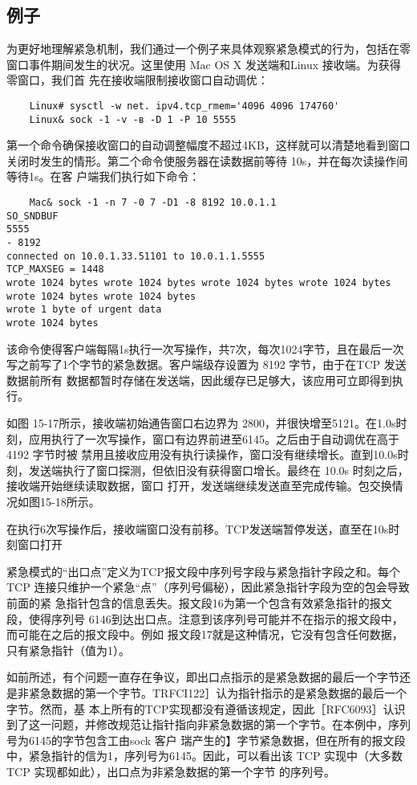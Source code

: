 \subsection{例子}
为更好地理解紧急机制，我们通过一个例子来具体观察紧急模式的行为，包括在零窗口事件期间发生的状况。这里使用 Mac OS X 发送端和Linux 接收端。为获得零窗口，我们首
先在接收端限制接收窗口自动调优：

\begin{verbatim}
    Linux# sysctl -w net. ipv4.tcp_rmem='4096 4096 174760'
    Linux& sock -1 -v -в -D 1 -P 10 5555
\end{verbatim}

第一个命令确保接收窗口的自动调整幅度不超过4KB，这样就可以清楚地看到窗口关闭时发生的情形。第二个命令使服务器在读数据前等待 10s，并在每次读操作间等待1s。在客
户端我们执行如下命令：
\begin{verbatim}
    Mac& sock -1 -n 7 -0 7 -D1 -8 8192 10.0.1.1
SO_SNDBUF
5555
- 8192
connected on 10.0.1.33.51101 to 10.0.1.1.5555
TCP_MAXSEG = 1448
wrote 1024 bytes wrote 1024 bytes wrote 1024 bytes wrote 1024 bytes wrote 1024 bytes wrote 1024 bytes
wrote 1 byte of urgent data
wrote 1024 bytes
\end{verbatim}

该命令使得客户端每隔1s执行一次写操作，共7次，每次1024字节，且在最后一次写之前写了1个字节的紧急数据。客户端级存设置为 8192 字节，由于在TCP 发送数据前所有
数据都暂时存储在发送端，因此缓存已足够大，该应用可立即得到执行。

如图 15-17所示，接收端初始通告窗口右边界为 2800，并很快增至5121。在1.0s时刻，应用执行了一次写操作，窗口有边界前进至6145。之后由于自动调优在高于4192 字节时被
禁用且接收应用没有执行读操作，窗口没有继续增长。直到10.0s时刻，发送端执行了窗口探测，但依旧没有获得窗口增长。最终在 10.0s 时刻之后，接收端开始继续读取数据，窗口
打开，发送端继续发送直至完成传输。包交换情况如图15-18所示。

在执行6次写操作后，接收端窗口没有前移。TCP发送端暂停发送，直至在10s时刻窗口打开

紧急模式的“出口点”定义为TCP报文段中序列号字段与紧急指针字段之和。每个TCP 连接只维护一个紧急“点”（序列号偏秘），因此紧急指针字段为空的包会导致前面的紧
急指针包含的信息丢失。报文段16为第一个包含有效紧急指针的报文段，使得序列号 6146到达出口点。注意到该序列号可能并不在指示的报文段中，而可能在之后的报文段中。例如
报文段17就是这种情况，它没有包含任何数据，只有紧急指针（值为1）。

如前所述，有个问题一直存在争议，即出口点指示的是紧急数据的最后一个字节还是非紧急数据的第一个字节。TRFCI122］认为指针指示的是紧急数据的最后一个字节。然而，基
本上所有的TCP实现都没有遵循该规定，因此［RFC6093］认识到了这一问题，并修改规范让指针指向非紧急数据的第一个字节。在本例中，序列号为6145的字节包含工由sock 客户
瑞产生的】字节紧急数据，但在所有的报文段中，紧急指针的信为1，序列号为6145。因此，可以看出该 TCP 实现中（大多数 TCP 实现都如此），出口点为非紧急数据的第一个字节
的序列号。

